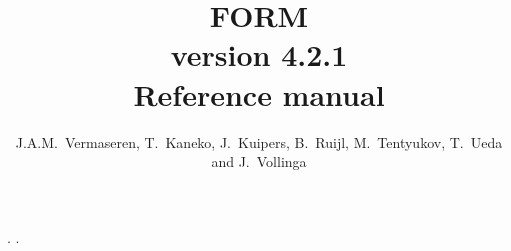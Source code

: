 \documentclass[11pt]{report}
\newcommand{\emptypage}{\newpage \thispagestyle{empty} \tiny{.} \normalsize}
\newcommand{\clearemptydoublepage}{\newpage{\pagestyle{empty}\cleardoublepage}}
\begin{document}
\begin{titlepage}
\title{\Huge FORM \\ \Large version 4.2.1 \\ \huge Reference manual}
\date{\formdate}
\author{J.A.M.~Vermaseren, T.~Kaneko, J.~Kuipers, B.~Ruijl, M.~Tentyukov, T.~Ueda and J.~Vollinga}
\end{titlepage}
\maketitle

\setcounter{page}{2}
\clearemptydoublepage
\emptypage
\clearemptydoublepage
{}
\setcounter{page}{1}
\clearemptydoublepage
\tableofcontents
\clearemptydoublepage
\emptypage
\clearemptydoublepage
{}
\setcounter{page}{1}























\printindex
\end{document}
